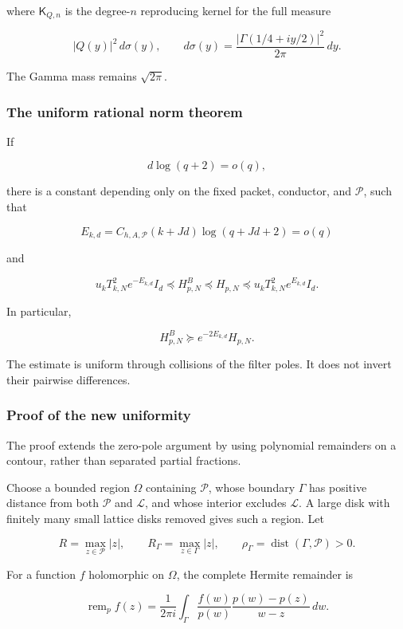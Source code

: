 \documentclass[11pt]{article}
\begin{document}
where \(\mathsf K_{Q,n}\) is the degree-\(n\) reproducing kernel for the full measure

\[
|Q(y)|^2\,d\sigma(y),\qquad
d\sigma(y)=\frac{|\Gamma(1/4+iy/2)|^2}{2\pi}\,dy.
\]

The Gamma mass remains \(\sqrt{2\pi}\).

\subsubsection{The uniform rational norm theorem}\label{the-uniform-rational-norm-theorem}

If

\[
d\log(q+2)=o(q),
\]

there is a constant depending only on the fixed packet, conductor, and \(\mathscr P\), such that

\[
E_{k,d}
=C_{h,A,\mathscr P}(k+Jd)\log(q+Jd+2)=o(q)
\]

and

\[
\boxed{
u_kT_{k,N}^2e^{-E_{k,d}}I_d
\preceq H^B_{p,N}
\preceq H_{p,N}
\preceq u_kT_{k,N}^2e^{E_{k,d}}I_d.
}
\tag{12}
\]

In particular,

\[
\boxed{
H^B_{p,N}\succeq e^{-2E_{k,d}}H_{p,N}.
}
\tag{13}
\]

The estimate is uniform through collisions of the filter poles. It does not invert their pairwise differences.

\subsubsection{Proof of the new uniformity}\label{proof-of-the-new-uniformity}

The proof extends the zero-pole argument by using polynomial remainders on a contour, rather than separated partial fractions.

Choose a bounded region \(\Omega\) containing \(\mathscr P\), whose boundary \(\Gamma\) has positive distance from both \(\mathscr P\) and \(\mathscr L\), and whose interior excludes \(\mathscr L\). A large disk with finitely many small lattice disks removed gives such a region. Let

\[
R=\max_{z\in\mathscr P}|z|,\qquad
R_\Gamma=\max_{z\in\Gamma}|z|,\qquad
\rho_\Gamma=\operatorname{dist}(\Gamma,\mathscr P)>0.
\]

For a function \(f\) holomorphic on \(\Omega\), the complete Hermite remainder is

\[
\boxed{
\operatorname{rem}_pf(z)
=
\frac1{2\pi i}
\int_\Gamma
\frac{f(w)}{p(w)}
\frac{p(w)-p(z)}{w-z}\,dw.
}
\tag{14}
\]
\end{document}
